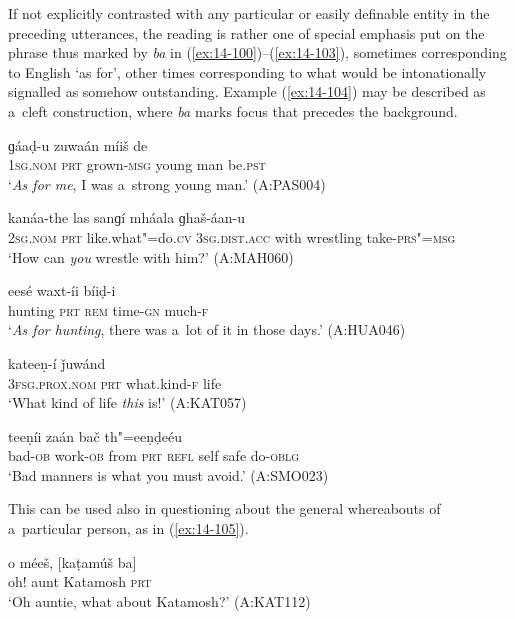 If not explicitly contrasted with any particular or easily definable entity in the preceding utterances, the reading is rather one of special emphasis put on the phrase thus marked by \textit{ba} in (\ref{ex:14-100})--(\ref{ex:14-103}), sometimes corresponding to English `as for', other times corresponding to what would be intonationally signalled as somehow outstanding. Example (\ref{ex:14-104}) may be described as a~cleft construction, where \textit{ba} marks focus that precedes the background.

\begin{exe}
\ex
\label{ex:14-100}
\gll [ma ba] ɡáaḍ-u zuwaán míiš de \\
\textsc{1sg.nom} \textsc{prt} grown-\textsc{msg} young man be.\textsc{pst}  \\
\glt `\textit{As for me}, I was a~strong young man.' (A:PAS004)

\ex
\label{ex:14-101}
\gll [tu ba] kanáa-the las sanɡí  mháala ɡhaš-áan-u \\
\textsc{2sg.nom} \textsc{prt} like.what"=do.\textsc{cv} \textsc{3sg.dist.acc} with wrestling take-\textsc{prs"=msg } \\
\glt `How can \textit{you} wrestle with him?' (A:MAH060)

\ex
\label{ex:14-102}
\gll [neečíir ba] eesé waxt-íi bíiḍ-i \\
hunting \textsc{prt} \textsc{rem} time-\textsc{gn} much-\textsc{f } \\
\glt `\textit{As for hunting}, there was a~lot of it in those days.' (A:HUA046)

\ex
\label{ex:14-103}
\gll [aní ba] kateeṇ-í ǰuwánd \\
\textsc{3fsg.prox.nom} \textsc{prt} what.kind-\textsc{f} life  \\
\glt `What kind of life \textit{this} is!' (A:KAT057)

\ex
\label{ex:14-104}
 teeṇíi zaán bač th"=eeṇḍeéu \\
bad-\textsc{ob} work-\textsc{ob } from \textsc{prt} \textsc{refl} self safe do-\textsc{oblg} \\
\glt `Bad manners is what you must avoid.' (A:SMO023)
\end{exe}

This can be used also in questioning about the general whereabouts of a~particular person, as in (\ref{ex:14-105}).

\begin{exe}
\ex
\label{ex:14-105}
\gll o méeš, [kaṭamúš ba] \\
oh! aunt Katamosh \textsc{prt } \\
\glt `Oh auntie, what about Katamosh?' (A:KAT112)
\end{exe}

